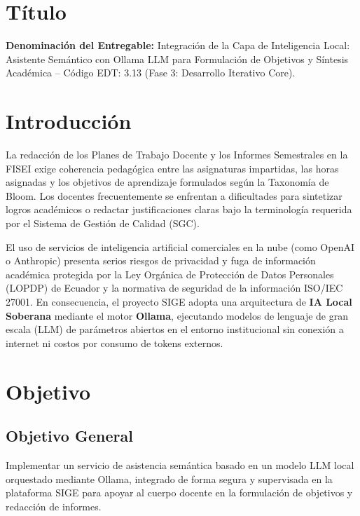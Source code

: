 \documentclass[12pt,a4paper]{article}
\begin{document}

\vspace{0.25cm}

\section{Título}
\textbf{Denominación del Entregable:} Integración de la Capa de Inteligencia Local: Asistente Semántico con Ollama LLM para Formulación de Objetivos y Síntesis Académica -- Código EDT: 3.13 (Fase 3: Desarrollo Iterativo Core).

\section{Introducción}
La redacción de los Planes de Trabajo Docente y los Informes Semestrales en la FISEI exige coherencia pedagógica entre las asignaturas impartidas, las horas asignadas y los objetivos de aprendizaje formulados según la Taxonomía de Bloom. Los docentes frecuentemente se enfrentan a dificultades para sintetizar logros académicos o redactar justificaciones claras bajo la terminología requerida por el Sistema de Gestión de Calidad (SGC).

El uso de servicios de inteligencia artificial comerciales en la nube (como OpenAI o Anthropic) presenta serios riesgos de privacidad y fuga de información académica protegida por la Ley Orgánica de Protección de Datos Personales (LOPDP) de Ecuador y la normativa de seguridad de la información ISO/IEC 27001. En consecuencia, el proyecto SIGE adopta una arquitectura de \textbf{IA Local Soberana} mediante el motor \textbf{Ollama}, ejecutando modelos de lenguaje de gran escala (LLM) de parámetros abiertos en el entorno institucional sin conexión a internet ni costos por consumo de tokens externos.

\section{Objetivo}

\subsection{Objetivo General}
Implementar un servicio de asistencia semántica basado en un modelo LLM local orquestado mediante Ollama, integrado de forma segura y supervisada en la plataforma SIGE para apoyar al cuerpo docente en la formulación de objetivos y redacción de informes.
\end{document}
